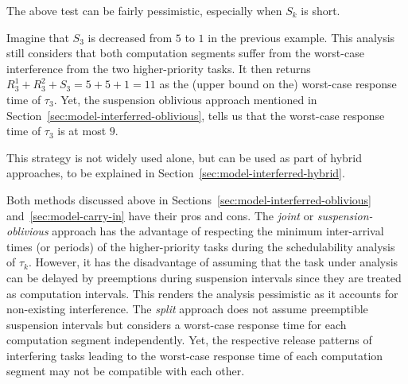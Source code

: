 The above test can be fairly pessimistic, especially when $S_k$ is short. 
\begin{example}
\label{ex:suspension-as-split-2}   
Imagine that $S_3$ is decreased from $5$ to $1$ in the previous example. This analysis still considers that both computation segments suffer from the worst-case interference from the two higher-priority tasks. It then returns $R_3^1 + R_3^2 + S_3 = 5 + 5 + 1 =11$ as the (upper bound on the) worst-case response time of $\tau_3$. Yet, the suspension oblivious approach mentioned in Section~\ref{sec:model-interferred-oblivious}, tells us that the worst-case response time of $\tau_3$ is at most $9$.
\hfill\myendproof  
\end{example} 

This strategy is not widely used alone, but can be used as part of hybrid approaches, to be explained in Section~\ref{sec:model-interferred-hybrid}.

\label{sec:model-interferred-hybrid}

Both methods discussed above in Sections~\ref{sec:model-interferred-oblivious} and~\ref{sec:model-carry-in} have their pros and cons. The \emph{joint} or \emph{suspension-oblivious} approach has the advantage of
respecting the minimum inter-arrival times (or periods) of the higher-priority tasks during the schedulability 
analysis of $\tau_k$. However, it has the disadvantage of assuming that the task under analysis can be delayed by preemptions during suspension intervals since they are treated as computation intervals. 
This renders the analysis pessimistic as it accounts for non-existing interference. The \emph{split} approach does not assume  
preemptible suspension intervals but  considers a worst-case response time for each computation segment independently. Yet, the respective
release patterns of interfering tasks leading to the worst-case response time of each computation segment may not be compatible with each other.

